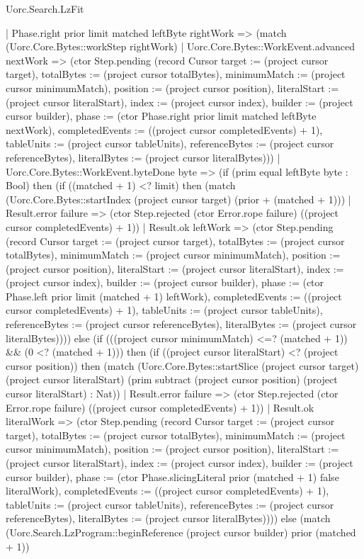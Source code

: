 \begin{lexlean}{Uorc.Search.LzFit}
\begin{semanticmodule}
{    | Phase.right prior limit matched leftByte rightWork => (match (Uorc.Core.Bytes::workStep rightWork)
      | Uorc.Core.Bytes::WorkEvent.advanced nextWork => (ctor Step.pending (record Cursor {target := (project cursor target), totalBytes := (project cursor totalBytes), minimumMatch := (project cursor minimumMatch), position := (project cursor position), literalStart := (project cursor literalStart), index := (project cursor index), builder := (project cursor builder), phase := (ctor Phase.right prior limit matched leftByte nextWork), completedEvents := ((project cursor completedEvents) + 1), tableUnits := (project cursor tableUnits), referenceBytes := (project cursor referenceBytes), literalBytes := (project cursor literalBytes)}))
      | Uorc.Core.Bytes::WorkEvent.byteDone byte => (if (prim equal leftByte byte : Bool) then (if ((matched + 1) <? limit) then (match (Uorc.Core.Bytes::startIndex (project cursor target) (prior + (matched + 1)))
        | Result.error failure => (ctor Step.rejected (ctor Error.rope failure) ((project cursor completedEvents) + 1))
        | Result.ok leftWork => (ctor Step.pending (record Cursor {target := (project cursor target), totalBytes := (project cursor totalBytes), minimumMatch := (project cursor minimumMatch), position := (project cursor position), literalStart := (project cursor literalStart), index := (project cursor index), builder := (project cursor builder), phase := (ctor Phase.left prior limit (matched + 1) leftWork), completedEvents := ((project cursor completedEvents) + 1), tableUnits := (project cursor tableUnits), referenceBytes := (project cursor referenceBytes), literalBytes := (project cursor literalBytes)}))) else (if (((project cursor minimumMatch) <=? (matched + 1)) && (0 <? (matched + 1))) then (if ((project cursor literalStart) <? (project cursor position)) then (match (Uorc.Core.Bytes::startSlice (project cursor target) (project cursor literalStart) (prim subtract (project cursor position) (project cursor literalStart) : Nat))
        | Result.error failure => (ctor Step.rejected (ctor Error.rope failure) ((project cursor completedEvents) + 1))
        | Result.ok literalWork => (ctor Step.pending (record Cursor {target := (project cursor target), totalBytes := (project cursor totalBytes), minimumMatch := (project cursor minimumMatch), position := (project cursor position), literalStart := (project cursor literalStart), index := (project cursor index), builder := (project cursor builder), phase := (ctor Phase.slicingLiteral prior (matched + 1) false literalWork), completedEvents := ((project cursor completedEvents) + 1), tableUnits := (project cursor tableUnits), referenceBytes := (project cursor referenceBytes), literalBytes := (project cursor literalBytes)}))) else (match (Uorc.Search.LzProgram::beginReference (project cursor builder) prior (matched + 1))
}
\end{semanticmodule}
\end{lexlean}
